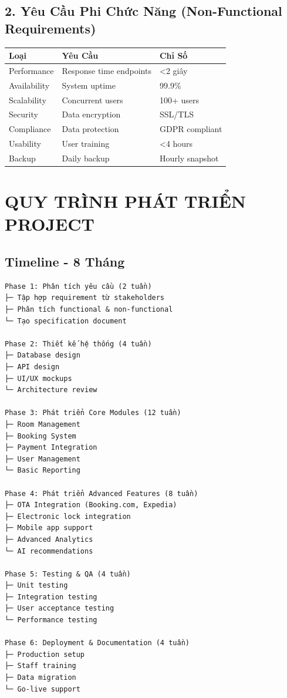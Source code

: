 \documentclass[12pt, a4paper]{report}
\begin{document}
\section{2. Yêu Cầu Phi Chức Năng (Non-Functional Requirements)}

\begin{table}[h]
\centering
\begin{tabular}{|p{2cm}|p{5cm}|p{3cm}|}
\hline
\textbf{Loại} & \textbf{Yêu Cầu} & \textbf{Chỉ Số} \\
\hline
Performance & Response time endpoints & <2 giây \\
\hline
Availability & System uptime & 99.9\% \\
\hline
Scalability & Concurrent users & 100+ users \\
\hline
Security & Data encryption & SSL/TLS \\
\hline
Compliance & Data protection & GDPR compliant \\
\hline
Usability & User training & <4 hours \\
\hline
Backup & Daily backup & Hourly snapshot \\
\hline
\end{tabular}
\end{table}

\chapter{QUY TRÌNH PHÁT TRIỂN PROJECT}

\section{Timeline - 8 Tháng}

\begin{tcolorbox}[colback=gray!5]
\begin{lstlisting}
Phase 1: Phân tích yêu cầu (2 tuần)
├─ Tập hợp requirement từ stakeholders
├─ Phân tích functional & non-functional
└─ Tạo specification document

Phase 2: Thiết kế hệ thống (4 tuần)
├─ Database design
├─ API design
├─ UI/UX mockups
└─ Architecture review

Phase 3: Phát triển Core Modules (12 tuần)
├─ Room Management
├─ Booking System
├─ Payment Integration
├─ User Management
└─ Basic Reporting

Phase 4: Phát triển Advanced Features (8 tuần)
├─ OTA Integration (Booking.com, Expedia)
├─ Electronic lock integration
├─ Mobile app support
├─ Advanced Analytics
└─ AI recommendations

Phase 5: Testing & QA (4 tuần)
├─ Unit testing
├─ Integration testing
├─ User acceptance testing
└─ Performance testing

Phase 6: Deployment & Documentation (4 tuần)
├─ Production setup
├─ Staff training
├─ Data migration
└─ Go-live support
\end{lstlisting}
\end{tcolorbox}
\end{document}

